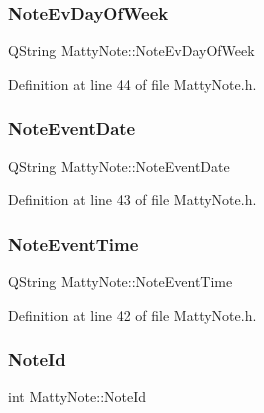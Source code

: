 \subsubsection{\texorpdfstring{Note\+Ev\+Day\+Of\+Week}{NoteEvDayOfWeek}}
{\footnotesize\ttfamily Q\+String Matty\+Note\+::\+Note\+Ev\+Day\+Of\+Week\hspace{0.3cm}{\ttfamily [private]}}



Definition at line 44 of file Matty\+Note.\+h.

\hypertarget{classMattyNote_a9644cd6552e27c1875d83edce2469db3}{}\label{classMattyNote_a9644cd6552e27c1875d83edce2469db3} 
\subsubsection{\texorpdfstring{Note\+Event\+Date}{NoteEventDate}}
{\footnotesize\ttfamily Q\+String Matty\+Note\+::\+Note\+Event\+Date\hspace{0.3cm}{\ttfamily [private]}}



Definition at line 43 of file Matty\+Note.\+h.

\hypertarget{classMattyNote_a3e69ae7fb7c8c616594a9647c14a192e}{}\label{classMattyNote_a3e69ae7fb7c8c616594a9647c14a192e} 
\subsubsection{\texorpdfstring{Note\+Event\+Time}{NoteEventTime}}
{\footnotesize\ttfamily Q\+String Matty\+Note\+::\+Note\+Event\+Time\hspace{0.3cm}{\ttfamily [private]}}



Definition at line 42 of file Matty\+Note.\+h.

\hypertarget{classMattyNote_a15a3c21ef00e8c629aeb58025121b0a9}{}\label{classMattyNote_a15a3c21ef00e8c629aeb58025121b0a9} 
\subsubsection{\texorpdfstring{Note\+Id}{NoteId}}
{\footnotesize\ttfamily int Matty\+Note\+::\+Note\+Id\hspace{0.3cm}{\ttfamily [private]}}



